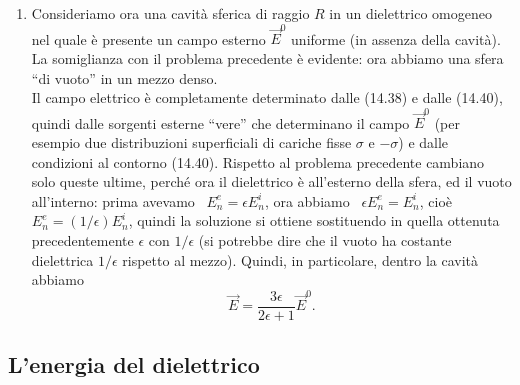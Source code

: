 \begin{enumerate}
\[    \]
    e dall'esterno
    \[
      E_n^e=E_0\cos\theta
      -\frac{\partial}{\partial r}\Big(\frac{p\cos\theta}{r^2}\Big)_{r=R}
      =E_0\cos\theta+2\frac{\epsilon-1}{2+\epsilon}E_0\cos\theta
      =\frac{3\epsilon}{2+\epsilon}E_0\cos\theta
    \]
    quindi, poich\'e \ $\epsilon E_n^i=E_n^e$, le (14.40) sono soddisfatte.
  \item Consideriamo ora una cavit\`a sferica di raggio $R$ in un dielettrico
    omogeneo nel quale \`e presente un campo esterno $\vec E^0$ uniforme (in
    assenza della cavit\`a). La somiglianza con il problema precedente \`e
    evidente: ora abbiamo una sfera ``di vuoto'' in un mezzo denso.\\
    Il campo elettrico \`e completamente determinato dalle (14.38) e dalle
    (14.40), quindi dalle sorgenti esterne ``vere'' che determinano il campo
    $\vec E^0$ (per esempio due distribuzioni superficiali di cariche fisse
    $\sigma$ e $-\sigma$) e dalle condizioni al contorno (14.40). Rispetto al
    problema precedente cambiano solo queste ultime, perch\'e ora il dielettrico
    \`e all'esterno della sfera, ed il vuoto all'interno: prima avevamo
    \ $E_n^e=\epsilon E_n^i$, ora abbiamo \ $\epsilon E_n^e=E_n^i$, cio\`e
    \ $E_n^e=(1/\epsilon)E_n^i$, quindi la soluzione si ottiene sostituendo in
    quella ottenuta precedentemente $\epsilon$ con $1/\epsilon$ (si potrebbe
    dire che il vuoto ha costante dielettrica $1/\epsilon$ rispetto al mezzo).
    Quindi, in particolare, dentro la cavit\`a abbiamo
    \begin{equation}
      \vec E=\frac{3\epsilon}{2\epsilon+1}\vec E^0.
      \tag{14.49}
    \end{equation}
\end{enumerate}

\subsection{L'energia del dielettrico}

